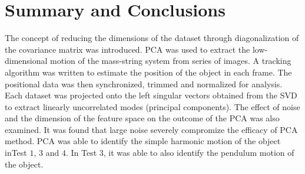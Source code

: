 \documentclass{article}
\begin{document}
\section{Summary and Conclusions}
The concept of reducing the dimensions of the dataset through diagonalization of the covariance matrix was introduced. PCA was used to extract the low-dimensional motion of the mass-string system from series of images. A tracking algorithm was written to estimate the position of the object in each frame. The positional data was then synchronized, trimmed and normalized for analysis. Each dataset was projected onto the left singular vectors obtained from the SVD to extract linearly uncorrelated modes (principal components). The effect of noise and the dimension of the feature space on the outcome of the PCA was also examined. It was found that large noise severely compromize the efficacy of PCA method. PCA was able to identify the simple harmonic motion of the object inTest $1$, $3$ and $4$. In Test $3$, it was able to also identify the pendulum motion of the object.
\end{document}
